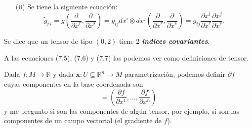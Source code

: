 \begin{itemize}
\begin{enumerate}
         \item[(ii)] Se tiene la siguiente ecuaci\'on:
         \begin{equation}
             \tilde{g}_{rs}=g\left(\frac{\partial}{\partial\tilde{x}^r},\frac{\partial}{\partial\tilde{x}^s}\right)=g_{ij}dx^i\otimes dx^j\left(\frac{\partial}{\partial\tilde{x}^r},\frac{\partial}{\partial\tilde{x}^s}\right)=g_{ij}\frac{\partial x^i}{\partial\tilde{x}^r}\frac{\partial x^j}{\partial\tilde{x}^s}.
         \end{equation}
     \end{enumerate}
          Se dice que un tensor de tipo $(0,2)$ tiene 2 \textit{\textbf{\'indices covariantes}}.
\end{itemize}

\begin{observation}
A las ecuaciones (7.5), (7.6) y (7.7) las podemos ver como definiciones de tensor.   
\end{observation}

\begin{example}
Dada $f\colon M\to\mathbb{R}$ y dada $\mathbf{x}\colon U\subseteq\mathbb{R}^n\to M$ parametrizaci\'on, podemos definir $\partial f$ cuyas componentes en la base coordenada son
\begin{equation*}
    [\partial f]=\left(\frac{\partial f}{\partial x^1},\dots,\frac{\partial f}{\partial x^n}\right)
\end{equation*}
 y me pregunto si son las componentes de alg\'un tensor, por ejemplo, si son las componentes de un campo vectorial (el gradiente de $f$).
\end{example}

